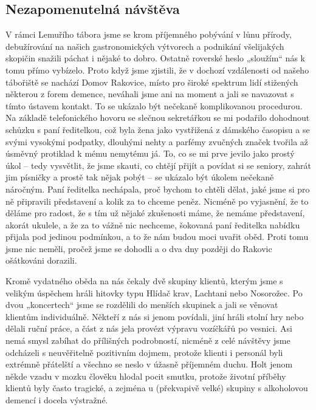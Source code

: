 \subsection*{Nezapomenutelná návštěva}
\label{sub:nezapomenutelna_navsteva}

V rámci Lemuřího tábora jsme se krom příjemného pobývání v lůnu přírody, debužírování na našich gastronomických výtvorech a podnikání všelijakých skopičin snažili páchat i nějaké to dobro. Ostatně roverské heslo „sloužím“ nás k tomu přímo vybízelo. Proto když jsme zjistili, že v dochozí vzdálenosti od našeho tábořiště se nachází Domov Rakovice, místo pro široké spektrum lidí stižených některou z forem demence, neváhali jsme ani na moment a jali se navazovat s tímto ústavem kontakt. To se ukázalo být nečekaně komplikovanou procedurou. Na základě telefonického hovoru se slečnou sekretářkou se mi podařilo dohodnout schůzku s paní ředitelkou, což byla žena jako vystřižená z dámského časopisu a se svými vysokými podpatky, dlouhými nehty a parfémy zvučných značek tvořila až úsměvný protiklad k mému nemytému já.
To, co se mi prve jevilo jako prostý úkol – tedy vysvětlit, že jsme skauti, co chtějí přijít a povídat si se seniory, zahrát jim písničky a prostě tak nějak pobýt – se ukázalo být úkolem nečekaně náročným. Paní ředitelka nechápala, proč bychom to chtěli dělat, jaké jsme si pro ně připravili představení a kolik za to chceme peněz. Nicméně po vyjasnění, že to děláme pro radost, že s tím už nějaké zkušenosti máme, že nemáme představení, akorát ukulele, a že za to vážně nic nechceme, šokovaná paní ředitelka nabídku přijala pod jedinou podmínkou, a to že nám budou moci uvařit oběd. Proti tomu jsme nic neměli, pročež jsme se dohodli a o dva dny později do Rakovic ošátkováni dorazili.

Kromě vydatného oběda na nás čekaly dvě skupiny klientů, kterým jsme s velikým úspěchem hráli hitovky typu Hlídač krav, Lachtani nebo Nosorožec. Po dvou „koncertech“ jsme se rozdělili do menších skupinek a jali se věnovat klientům individuálně. Někteří z nás si jenom povídali, jiní hráli stolní hry nebo dělali ruční práce, a část z nás jela provézt výpravu vozíčkářů po vesnici. Asi nemá smysl zabíhat do přílišných podrobností, nicméně z celé návštěvy jsme odcházeli s neuvěřitelně pozitivním dojmem, protože klienti i personál byli extrémně přátelští a všechno se neslo v úžasně příjemném duchu. Holt jenom někde vzadu v mozku člověku hlodal pocit smutku, protože životní příběhy klientů byly často tragické, a zejména u (překvapivě velké) skupiny s alkoholovou demencí i docela výstražné.

